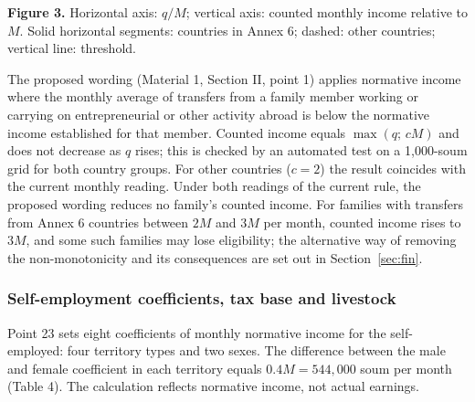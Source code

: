 \documentclass[14pt,a4paper]{extarticle}
\begin{document}
\begin{center}
\end{center}
\textbf{Figure 3.} Horizontal axis: $q/M$; vertical axis: counted monthly income relative to $M$. Solid horizontal segments: countries in Annex 6; dashed: other countries; vertical line: threshold.

The proposed wording (Material 1, Section II, point 1) applies normative income where the monthly average of transfers from a family member working or carrying on entrepreneurial or other activity abroad is below the normative income established for that member. Counted income equals $\max(q;\,cM)$ and does not decrease as $q$ rises; this is checked by an automated test on a 1,000-soum grid for both country groups. For other countries ($c=2$) the result coincides with the current monthly reading. Under both readings of the current rule, the proposed wording reduces no family’s counted income. For families with transfers from Annex 6 countries between $2M$ and $3M$ per month, counted income rises to $3M$, and some such families may lose eligibility; the alternative way of removing the non-monotonicity and its consequences are set out in Section~\ref{sec:fin}.

\subsubsection{Self-employment coefficients, tax base and livestock}\label{res:coef}
Point 23 sets eight coefficients of monthly normative income for the self-employed: four territory types and two sexes. The difference between the male and female coefficient in each territory equals $0.4M=544{,}000$ soum per month (Table 4). The calculation reflects normative income, not actual earnings.
\end{document}
